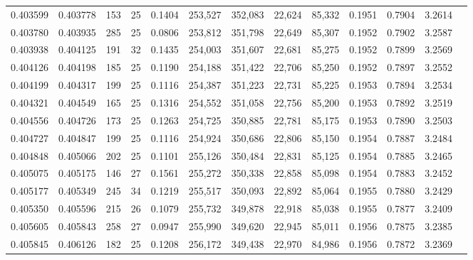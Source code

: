 \begin{tabular}{rrrrrrrrrrrrr}
0.403599 & 0.403778 &   153 &  25 &                                     0.1404 & 253,527 & 352,083 &  22,624 &  85,332 & 0.1951 & 0.7904 & 3.2614 \\
0.403780 & 0.403935 &   285 &  25 &                                     0.0806 & 253,812 & 351,798 &  22,649 &  85,307 & 0.1952 & 0.7902 & 3.2587 \\
0.403938 & 0.404125 &   191 &  32 &                                     0.1435 & 254,003 & 351,607 &  22,681 &  85,275 & 0.1952 & 0.7899 & 3.2569 \\
0.404126 & 0.404198 &   185 &  25 &                                     0.1190 & 254,188 & 351,422 &  22,706 &  85,250 & 0.1952 & 0.7897 & 3.2552 \\
0.404199 & 0.404317 &   199 &  25 &                                     0.1116 & 254,387 & 351,223 &  22,731 &  85,225 & 0.1953 & 0.7894 & 3.2534 \\
0.404321 & 0.404549 &   165 &  25 &                                     0.1316 & 254,552 & 351,058 &  22,756 &  85,200 & 0.1953 & 0.7892 & 3.2519 \\
0.404556 & 0.404726 &   173 &  25 &                                     0.1263 & 254,725 & 350,885 &  22,781 &  85,175 & 0.1953 & 0.7890 & 3.2503 \\
0.404727 & 0.404847 &   199 &  25 &                                     0.1116 & 254,924 & 350,686 &  22,806 &  85,150 & 0.1954 & 0.7887 & 3.2484 \\
0.404848 & 0.405066 &   202 &  25 &                                     0.1101 & 255,126 & 350,484 &  22,831 &  85,125 & 0.1954 & 0.7885 & 3.2465 \\
0.405075 & 0.405175 &   146 &  27 &                                     0.1561 & 255,272 & 350,338 &  22,858 &  85,098 & 0.1954 & 0.7883 & 3.2452 \\
0.405177 & 0.405349 &   245 &  34 &                                     0.1219 & 255,517 & 350,093 &  22,892 &  85,064 & 0.1955 & 0.7880 & 3.2429 \\
0.405350 & 0.405596 &   215 &  26 &                                     0.1079 & 255,732 & 349,878 &  22,918 &  85,038 & 0.1955 & 0.7877 & 3.2409 \\
0.405605 & 0.405843 &   258 &  27 &                                     0.0947 & 255,990 & 349,620 &  22,945 &  85,011 & 0.1956 & 0.7875 & 3.2385 \\
0.405845 & 0.406126 &   182 &  25 &                                     0.1208 & 256,172 & 349,438 &  22,970 &  84,986 & 0.1956 & 0.7872 & 3.2369 \\

\end{tabular}

